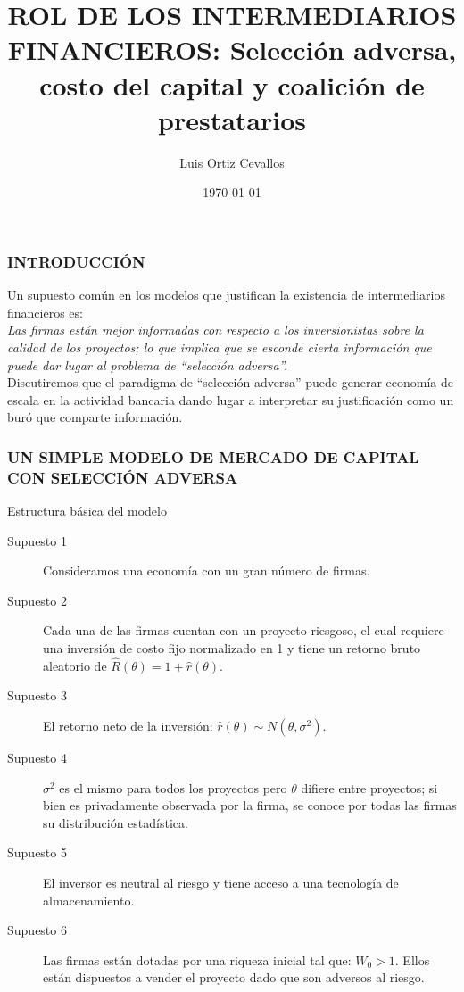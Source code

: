 \documentclass[10pt, xcolor=table, x11names]{beamer}
\title[]{ROL DE LOS INTERMEDIARIOS FINANCIEROS: Selección adversa, costo del capital y coalición de prestatarios}
\author[Luis Ortiz]{Luis Ortiz Cevallos}
\institute[SECMCA]{\bf SECMCA}
\date[\today]{\footnotesize \today}
\begin{document}
\begin{frame}
\titlepage
\end{frame}




\begin{frame}
	\frametitle{{\normalsize INTRODUCCIÓN} {}}
Un supuesto común en los modelos que justifican la existencia de intermediarios financieros es:\\
\textit{Las firmas están mejor informadas con respecto a los inversionistas sobre la calidad de los proyectos; lo que implica que se esconde cierta información que puede dar lugar al problema de ``selección adversa''.}\\
Discutiremos que el paradigma de ``selección adversa'' puede generar economía de escala en la actividad bancaria dando lugar a interpretar su justificación como un buró que comparte información.\\
 

\end{frame}

\begin{frame}
    \frametitle{{\normalsize UN SIMPLE MODELO DE MERCADO DE CAPITAL CON SELECCIÓN ADVERSA} {}}
    
    \begin{block} {Estructura básica del modelo}
        \begin{description}
            \item[Supuesto 1] Consideramos una economía con un gran número de firmas.
            \item[Supuesto 2] Cada una de las firmas cuentan con un proyecto riesgoso, el cual requiere una inversión de costo fijo normalizado en 1 y tiene un retorno bruto aleatorio de $\hat{R}(\theta)=1+\hat{r}(\theta) $. 
            \item[Supuesto 3] El retorno neto de la inversión: $\hat{r}(\theta)\sim N(\theta,\sigma^{2}) $.
            \item[Supuesto 4] $\sigma^{2} $ es el mismo para todos los proyectos pero $ \theta$ difiere entre proyectos; si bien es privadamente observada por la firma, se conoce por todas las firmas su distribución estadística. 
            \item[Supuesto 5]  El inversor es neutral al riesgo y tiene acceso a una tecnología de almacenamiento.
            \item[Supuesto 6]  Las firmas están dotadas por una riqueza inicial tal que: $W_{0}>1 $. Ellos están dispuestos a vender el proyecto dado que son adversos al riesgo.
            \end{description}
        
    \end{block}	
    
\end{frame}
\end{document}
